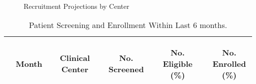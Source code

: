 \documentclass[dvips,10pt]{article}
\begin{document}
\begin{figure}
\caption{Recruitment Projections by Center}
\end{figure}
\clearpage
\begin{table}[t]
\caption
{ Patient Screening and Enrollment Within Last 6 months. }
\begin{center}
\begin{tabular}{ @{}l@{}
@{}l@{}@{}p{1.5em}@{}@{}c@{}@{}p{1.5em}@{}@{}c@{}@{}p{1.5em}@{}@{}c@{}@{}p{1.5em}@{}@{}c@{}
}
\hline

& \parbox{6em}{\begin{center}Month\end{center}} && \parbox{6em}{\begin{center}Clinical Center\end{center}} && \parbox{6em}{\begin{center}No. Screened\end{center}} && \parbox{6em}{\begin{center}No. Eligible (\%)\end{center}} && \parbox{6em}{\begin{center}No. Enrolled (\%)\end{center}} \\

\hline


\end{tabular}
\end{center}
\end{table}
\end{document}
